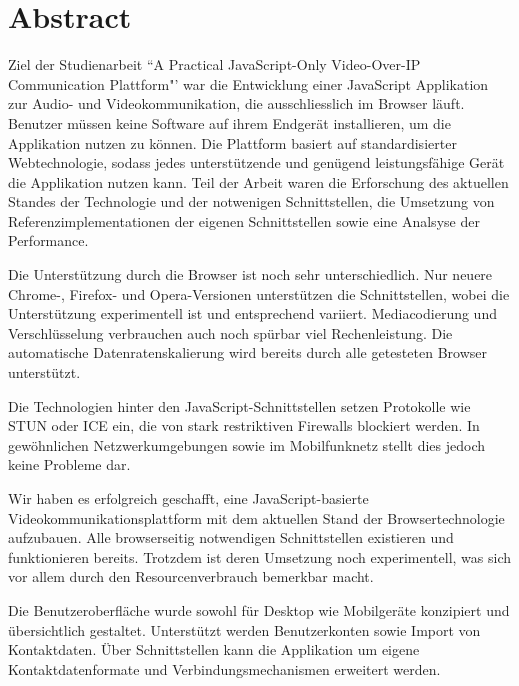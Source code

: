 \chapter{Abstract}

Ziel der Studienarbeit ``A Practical JavaScript-Only Video-Over-IP Communication Plattform"' war die Entwicklung einer JavaScript Applikation zur Audio- und Videokommunikation, die ausschliesslich im Browser läuft. Benutzer müssen keine Software auf ihrem Endgerät installieren, um die Applikation nutzen zu können. Die Plattform basiert auf standardisierter Webtechnologie, sodass jedes unterstützende und genügend leistungsfähige Gerät die Applikation nutzen kann.
Teil der Arbeit waren die Erforschung des aktuellen Standes der Technologie und der notwenigen Schnittstellen, die Umsetzung von Referenzimplementationen der eigenen Schnittstellen sowie eine Analsyse der Performance.

Die Unterstützung durch die Browser ist noch sehr unterschiedlich. Nur neuere Chrome-, Firefox- und Opera-Versionen unterstützen die Schnittstellen, wobei die Unterstützung experimentell ist und entsprechend variiert. Mediacodierung und Verschlüsselung verbrauchen auch noch spürbar viel Rechenleistung. Die automatische Datenratenskalierung wird bereits durch alle getesteten Browser unterstützt.

Die Technologien hinter den JavaScript-Schnittstellen setzen Protokolle wie STUN oder ICE ein, die von stark restriktiven Firewalls blockiert werden. In gewöhnlichen Netzwerkumgebungen sowie im Mobilfunknetz stellt dies jedoch keine Probleme dar. 

Wir haben es erfolgreich geschafft, eine JavaScript-basierte Videokommunikationsplattform mit dem aktuellen Stand der Browsertechnologie aufzubauen. Alle browserseitig notwendigen Schnittstellen existieren und funktionieren bereits. Trotzdem ist deren Umsetzung noch experimentell, was sich vor allem durch den Resourcenverbrauch bemerkbar macht.

Die Benutzeroberfläche wurde sowohl für Desktop wie Mobilgeräte konzipiert und übersichtlich gestaltet. Unterstützt werden Benutzerkonten sowie Import von Kontaktdaten.
Über Schnittstellen kann die Applikation um eigene Kontaktdatenformate und Verbindungsmechanismen erweitert werden.